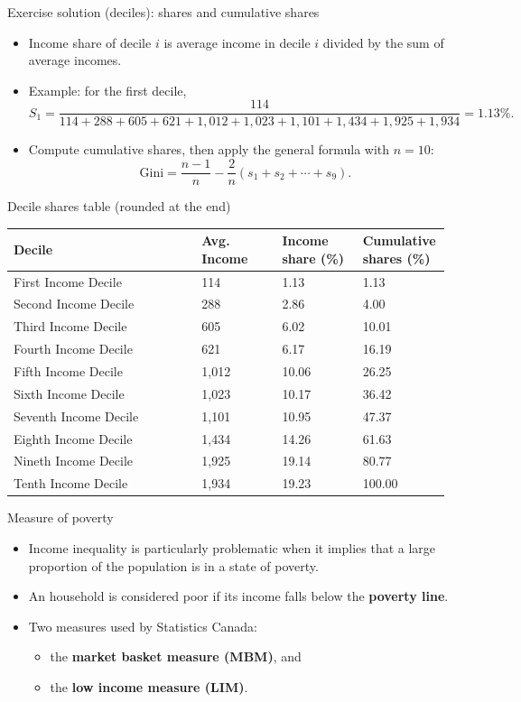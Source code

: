 \documentclass[aspectratio=169]{beamer}
\begin{document}
\begin{frame}{Exercise solution (deciles): shares and cumulative shares}
\transfade
\begin{itemize}[<+->]
\item Income share of decile $i$ is average income in decile $i$ divided by the sum of average incomes.
\item Example: for the first decile,
\[
S_1=\frac{114}{114+288+605+621+1{,}012+1{,}023+1{,}101+1{,}434+1{,}925+1{,}934}=1.13\%.
\]
\item Compute cumulative shares, then apply the general formula with $n=10$:
\[
\text{Gini}=\frac{n-1}{n}-\frac{2}{n}(s_1+s_2+\cdots+s_9).
\]
\end{itemize}
\end{frame}

\begin{frame}{Decile shares table (rounded at the end)}
\transfade
\begin{center}
\small
\begin{tabular}{p{0.42\linewidth} p{0.18\linewidth} p{0.18\linewidth} p{0.18\linewidth}}
\toprule
\textbf{Decile} & \textbf{Avg. Income} & \textbf{Income share (\%)} & \textbf{Cumulative shares (\%)} \\
\midrule
First Income Decile & 114 & 1.13 & 1.13 \\
Second Income Decile & 288 & 2.86 & 4.00 \\
Third Income Decile & 605 & 6.02 & 10.01 \\
Fourth Income Decile & 621 & 6.17 & 16.19 \\
Fifth Income Decile & 1{,}012 & 10.06 & 26.25 \\
Sixth Income Decile & 1{,}023 & 10.17 & 36.42 \\
Seventh Income Decile & 1{,}101 & 10.95 & 47.37 \\
Eighth Income Decile & 1{,}434 & 14.26 & 61.63 \\
Nineth Income Decile & 1{,}925 & 19.14 & 80.77 \\
Tenth Income Decile & 1{,}934 & 19.23 & 100.00 \\
\bottomrule
\end{tabular}
\end{center}
\end{frame}

\begin{frame}{Measure of poverty}
\transfade
\begin{itemize}[<+->]
\item Income inequality is particularly problematic when it implies that a large proportion of the population is in a state of poverty.
\item An household is considered poor if its income falls below the \textbf{poverty line}.
\item Two measures used by Statistics Canada:
\begin{itemize}[<+->]
\item the \textbf{market basket measure (MBM)}, and
\item the \textbf{low income measure (LIM)}.
\end{itemize}
\end{itemize}
\end{frame}
\end{document}
